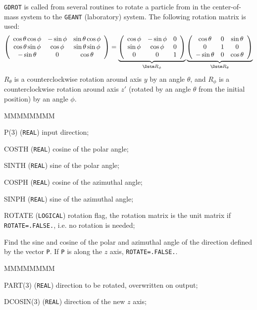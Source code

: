 {\tt GDROT} is called from several routines to rotate a particle from
in the center-of-mass system to the {\tt GEANT} (laboratory) system.
The following rotation matrix is used:
\[ \left( \begin{array}{ccc}
\cos \theta \cos \phi & -\sin \phi   & \sin \theta \cos \phi \\
\cos \theta \sin \phi & \cos \phi    & \sin \theta \sin \phi \\
- \sin \theta         &  0           & \cos \theta     
\end{array}  \right )
=
\underbrace{
\left( \begin{array}{ccc}
\cos \phi & -\sin \phi & 0 \\
\sin \phi & \cos \phi  & 0 \\
0         &      0     & 1
\end{array}  \right )}_{\Dstm R_\phi}
\underbrace{
\left( \begin{array}{ccc}
\cos \theta  & 0 & \sin \theta \\
0            & 1 & 0           \\
-\sin \theta & 0 & \cos \theta
\end{array}  \right )}_{\Dstm R_\theta} \]
$R_\theta$ is a counterclockwise rotation around axis $y$ by an angle $\theta$, 
and $R_\phi$ is a counterclockwise rotation around axis $z'$ (rotated by an 
angle $\theta$ from the initial position) by an angle $\phi$.

\begin{DLtt}{MMMMMMMM}
\item[P(3)] ({\tt REAL}) input direction;
\item[COSTH] ({\tt REAL}) cosine of the polar angle;
\item[SINTH] ({\tt REAL}) sine of the polar angle;
\item[COSPH] ({\tt REAL}) cosine of the azimuthal angle;
\item[SINPH] ({\tt REAL}) sine of the azimuthal angle;
\item[ROTATE] ({\tt LOGICAL}) rotation flag, the rotation matrix is the unit
matrix if {\tt ROTATE=.FALSE.}, i.e. no rotation is needed;
\end{DLtt}

Find the sine and cosine of the polar and azimuthal angle of the direction
defined by the vector {\tt P}. If {\tt P} is along the $z$ axis, 
{\tt ROTATE=.FALSE.}.

\begin{DLtt}{MMMMMMMM}
\item[PART(3)] ({\tt REAL}) direction to be rotated, overwritten on output;
\item[DCOSIN(3)] ({\tt REAL}) direction of the new $z$ axis;
\end{DLtt}

